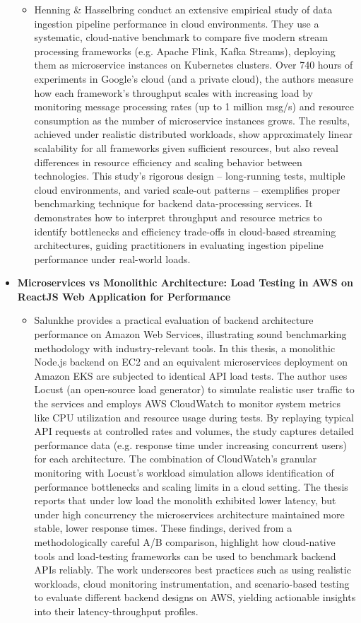 \documentclass[11pt]{article}
\begin{document}
\begin{itemize}
    \begin{itemize}
        \item[] Henning & Hasselbring conduct an extensive empirical study of data ingestion pipeline performance in cloud environments. They use a systematic, cloud-native benchmark to compare five modern stream processing frameworks (e.g. Apache Flink, Kafka Streams), deploying them as microservice instances on Kubernetes clusters. Over 740 hours of experiments in Google’s cloud (and a private cloud), the authors measure how each framework’s throughput scales with increasing load by monitoring message processing rates (up to 1 million msg/s) and resource consumption as the number of microservice instances grows. The results, achieved under realistic distributed workloads, show approximately linear scalability for all frameworks given sufficient resources, but also reveal differences in resource efficiency and scaling behavior between technologies. This study’s rigorous design – long-running tests, multiple cloud environments, and varied scale-out patterns – exemplifies proper benchmarking technique for backend data-processing services. It demonstrates how to interpret throughput and resource metrics to identify bottlenecks and efficiency trade-offs in cloud-based streaming architectures, guiding practitioners in evaluating ingestion pipeline performance under real-world loads.
    \end{itemize}
    \item[] \textbf{Microservices vs Monolithic Architecture: Load Testing in AWS on ReactJS Web Application for Performance}
    \begin{itemize}
        \item[] Salunkhe provides a practical evaluation of backend architecture performance on Amazon Web Services, illustrating sound benchmarking methodology with industry-relevant tools. In this thesis, a monolithic Node.js backend on EC2 and an equivalent microservices deployment on Amazon EKS are subjected to identical API load tests. The author uses Locust (an open-source load generator) to simulate realistic user traffic to the services and employs AWS CloudWatch to monitor system metrics like CPU utilization and resource usage during tests. By replaying typical API requests at controlled rates and volumes, the study captures detailed performance data (e.g. response time under increasing concurrent users) for each architecture. The combination of CloudWatch’s granular monitoring with Locust’s workload simulation allows identification of performance bottlenecks and scaling limits in a cloud setting. The thesis reports that under low load the monolith exhibited lower latency, but under high concurrency the microservices architecture maintained more stable, lower response times. These findings, derived from a methodologically careful A/B comparison, highlight how cloud-native tools and load-testing frameworks can be used to benchmark backend APIs reliably. The work underscores best practices such as using realistic workloads, cloud monitoring instrumentation, and scenario-based testing to evaluate different backend designs on AWS, yielding actionable insights into their latency-throughput profiles.
    \end{itemize}
\end{itemize}
\end{document}
